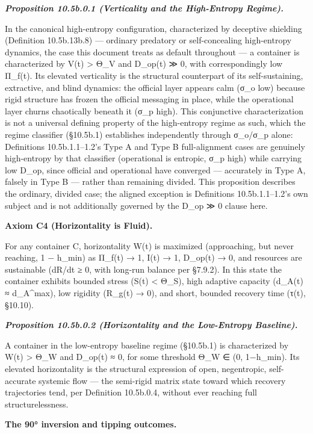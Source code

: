 \documentclass[
]{article}
\begin{document}
\emph{\textbf{Proposition 10.5b.0.1 (Verticality and the High-Entropy
Regime).}}

In the canonical high-entropy configuration, characterized by deceptive
shielding (Definition 10.5b.13b.8) --- ordinary predatory or
self-concealing high-entropy dynamics, the case this document treats as
default throughout --- a container is characterized by V(t)
\textgreater{} Θ\_V and D\_op(t) ≫ 0, with correspondingly low Π\_f(t).
Its elevated verticality is the structural counterpart of its
self-sustaining, extractive, and blind dynamics: the official layer
appears calm (σ\_o low) because rigid structure has frozen the official
messaging in place, while the operational layer churns chaotically
beneath it (σ\_p high). This conjunctive characterization is not a
universal defining property of the high-entropy regime as such, which
the regime classifier (§10.5b.1) establishes independently through
σ\_o/σ\_p alone: Definitions 10.5b.1.1--1.2's Type A and Type B
full-alignment cases are genuinely high-entropy by that classifier
(operational is entropic, σ\_p high) while carrying low D\_op, since
official and operational have converged --- accurately in Type A,
falsely in Type B --- rather than remaining divided. This proposition
describes the ordinary, divided case; the aligned exception is
Definitions 10.5b.1.1--1.2's own subject and is not additionally
governed by the D\_op ≫ 0 clause here.

\textbf{Axiom C4 (Horizontality is Fluid).}

For any container C, horizontality W(t) is maximized (approaching, but
never reaching, 1 − h\_min) as Π\_f(t) → 1, I(t) → 1, D\_op(t) → 0, and
resources are sustainable (dR/dt ≥ 0, with long-run balance per §7.9.2).
In this state the container exhibits bounded stress (S(t) \textless{}
Θ\_S), high adaptive capacity (d\_A(t) ≈ d\_A\^{}max), low rigidity
(R\_g(t) → 0), and short, bounded recovery time (τ(t), §10.10).

\emph{\textbf{Proposition 10.5b.0.2 (Horizontality and the Low-Entropy
Baseline).}}

A container in the low-entropy baseline regime (§10.5b.1) is
characterized by W(t) \textgreater{} Θ\_W and D\_op(t) ≈ 0, for some
threshold Θ\_W ∈ (0, 1−h\_min). Its elevated horizontality is the
structural expression of open, negentropic, self-accurate systemic flow
--- the semi-rigid matrix state toward which recovery trajectories tend,
per Definition 10.5b.0.4, without ever reaching full structurelessness.

\textbf{The 90° inversion and tipping outcomes.}
\end{document}
